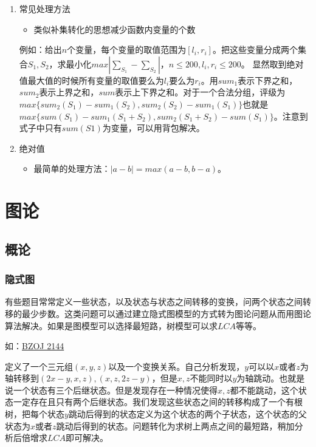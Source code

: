 \documentclass[11pt]{article}
\begin{document}
\begin{enumerate}
\item 常见处理方法
\label{sec-1-5-1-1}

\begin{itemize}
\item 类似补集转化的思想减少函数内变量的个数
\end{itemize}

例如：给出\(n\)个变量，每个变量的取值范围为\([l_i,r_i]\)。把这些变量分成两个集合\(S_1,S_2\)，求最小化\(max|\sum_{S_1}-\sum_{S_2}|\)，\(n \leq 200, l_i, r_i \leq 200\)。 显然取到绝对值最大值的时候所有变量的取值要么为\(l_i\)要么为\(r_i\)。用\(sum_1\)表示下界之和，\(sum_2\)表示上界之和，\(sum\)表示上下界之和。对于一个合法分组，评级为\(max\{sum_2(S_1)-sum_1(S_2),sum_2(S_2)-sum_1(S_1)\}\)也就是\(max\{sum(S_1)-sum_1(S_1+S_2),sum_2(S_1+S_2)-sum(S_1)\}\)。注意到式子中只有\(sum(S1)\)为变量，可以用背包解决。

\item 绝对值
\label{sec-1-5-1-2}

\begin{itemize}
\item 最简单的处理方法：\(|a-b| = max(a - b, b - a)\)。
\end{itemize}
\end{enumerate}

\section{图论}
\label{sec-2}
\subsection{概论}
\label{sec-2-1}
\subsubsection{隐式图}
\label{sec-2-1-1}

有些题目常常定义一些状态，以及状态与状态之间转移的变换，问两个状态之间转移的最少步数。这类问题可以通过建立隐式图模型的方式转为图论问题从而用图论算法解决。如果是图模型可以选择最短路，树模型可以求\(LCA\)等等。

如：\href{http://www.lydsy.com/JudgeOnline/problem.php?id=2144}{BZOJ 2144}

定义了一个三元组\((x,y,z)\)以及一个变换关系。自己分析发现，\(y\)可以以\(x\)或者\(z\)为轴转移到\((2x-y,x,z),(x,z,2z-y)\)，但是\(x,z\)不能同时以\(y\)为轴跳动。也就是说一个状态有三个后继状态。但是发现存在一种情况使得\(x,z\)都不能跳动，这个状态一定存在且只有两个后继状态。我们发现这些状态之间的转移构成了一个有根树，把每个状态\(y\)跳动后得到的状态定义为这个状态的两个子状态，这个状态的父状态为\(x\)或者\(z\)跳动后得到的状态。问题转化为求树上两点之间的最短路，稍加分析后倍增求\(LCA\)即可解决。
\end{document}
